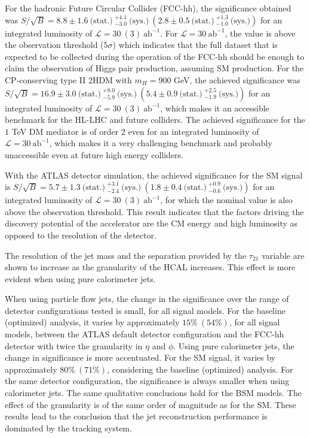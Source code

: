 For the hadronic Future Circular Collider (FCC-hh), the significance obtained was $S/\sqrt{B}= 8.8\pm 1.6~\text{(stat.)}~^{+4.1}_{-3.0}~\text{(sys.)}~\left(2.8\pm0.5~\text{(stat.)}~^{+1.3}_{-1.0}~\text{(sys.)}\right)$ for an integrated luminosity of $\mathcal{L}=30~(3)~\text{ab}^{-1}$. For $\mathcal{L}=30~\text{ab}^{-1}$, the value is above the observation threshold ($5\sigma$) which indicates that the full dataset that is expected to be collected during the operation of the FCC-hh should be enough to claim the observation of Higgs pair production, assuming SM production. For the CP-conserving type II 2HDM with $m_H=900$ GeV, the achieved significance was $S/\sqrt{B}=16.9\pm 3.0~\text{(stat.)}~^{+8.0}_{-5.9}~\text{(sys.)} ~\left(5.4\pm0.9~\text{(stat.)}~^{+2.5}_{-1.9}~\text{(sys.)}\right)$ for an integrated luminosity of $\mathcal{L}=30~(3)~\text{ab}^{-1}$, which makes it an accessible benchmark for the HL-LHC and future colliders. The achieved significance for the $1$ TeV DM mediator is of order $2$ even for an integrated luminosity of $\mathcal{L}=30~\text{ab}^{-1}$, which makes it a very challenging benchmark and probably unaccessible even at future high energy colliders. 

With the ATLAS detector simulation, the achieved significance for the SM signal is $S/\sqrt{B}=5.7\pm 1.3~\text{(stat.)}~^{+3.1}_{-2.4}~\text{(sys.)} ~\left(1.8\pm 0.4~\text{(stat.)}~^{+0.9}_{-0.6}~\text{(sys.)}\right)$ for an integrated luminosity of $\mathcal{L}=30~(3)~\text{ab}^{-1}$, for which the nominal value is also above the observation threshold. This result indicates that the factors driving the discovery potential of the accelerator are the CM energy and high luminosity as opposed to the resolution of the detector.

The resolution of the jet mass and the separation provided by the $\tau_{21}$ variable are shown to increase as the granularity of the HCAL increases. This effect is more evident when using pure calorimeter jets. 

When using particle flow jets, the change in the significance over the range of detector configurations tested is small, for all signal models. For the baseline (optimized) analysis, it varies by approximately $15\%~(54\%)$, for all signal models, between the ATLAS default detector configuration and the FCC-hh detector with twice the granularity in $\eta$ and $\phi$. Using pure calorimeter jets, the change in significance is more accentuated. For the SM signal, it varies by approximately $80\%~(71\%)$, considering the baseline (optimized) analysis. For the same detector configuration, the significance is always smaller when using calorimeter jets. The same qualitative conclusions hold for the BSM models. The effect of the granularity is of the same order of magnitude as for the SM.
These results lead to the conclusion that the jet reconstruction performance is dominated by the tracking system. 

